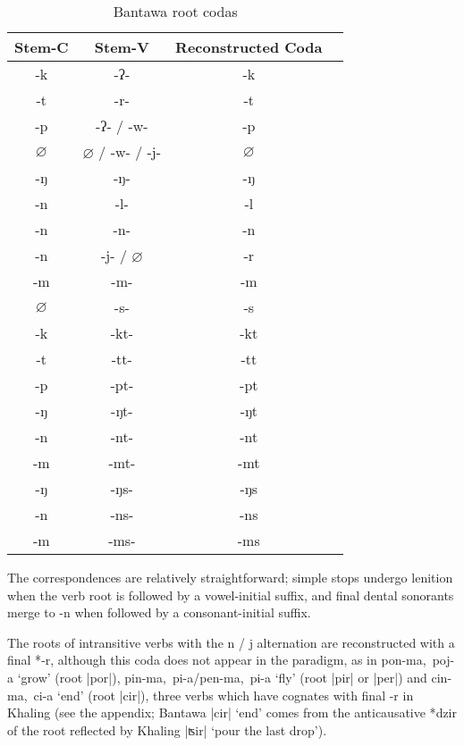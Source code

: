 \documentclass[oneside,a4paper,11pt]{article}
\newcommand{\ipa}[1]{{\phon\mbox{#1}}} %
\newcommand{\dhatu}[2]{|\ipa{#1}| `#2'}
\begin{document}
\begin{table}[h]
\caption{Bantawa root codas} \centering \label{tab:bantawa.root}
\begin{tabular}{cccc}
\toprule
Stem-C & Stem-V & Reconstructed Coda \\
\midrule
\ipa{-k} & \ipa{-ʔ-} & \ipa{-k} \\
\ipa{-t} & \ipa{-r-} & \ipa{-t} \\
\ipa{-p} & \ipa{-ʔ-} /  \ipa{-w-} & \ipa{-p} \\
$\varnothing$ & $\varnothing$ / \ipa{-w-} / \ipa{-j-} & $\varnothing$ \\
\ipa{-ŋ} & \ipa{-ŋ-} & \ipa{-ŋ} \\
\ipa{-n} & \ipa{-l-} & \ipa{-l} \\
\ipa{-n} & \ipa{-n-}  & \ipa{-n} \\
\ipa{-n} & \ipa{-j-} / $\varnothing$ & \ipa{-r} \\
\ipa{-m} & \ipa{-m-} & \ipa{-m} \\
$\varnothing$ & \ipa{-s-} & \ipa{-s} \\
\midrule
\ipa{-k} & \ipa{-kt-} & \ipa{-kt} \\
\ipa{-t} & \ipa{-tt-} & \ipa{-tt} \\
\ipa{-p} & \ipa{-pt-} & \ipa{-pt} \\
\ipa{-ŋ} & \ipa{-ŋt-} & \ipa{-ŋt} \\
\ipa{-n} & \ipa{-nt-} & \ipa{-nt} \\
\ipa{-m} & \ipa{-mt-} & \ipa{-mt} \\
\midrule
\ipa{-ŋ} & \ipa{-ŋs-} & \ipa{-ŋs}  \\
\ipa{-n} & \ipa{-ns-} & \ipa{-ns} \\
\ipa{-m} & \ipa{-ms-} & \ipa{-ms}   \\
\bottomrule
\end{tabular}
\end{table}

The correspondences are relatively straightforward; simple stops undergo lenition when the verb root is followed by a vowel-initial suffix, and final dental sonorants merge to \ipa{-n} when followed by a consonant-initial suffix. 

The roots of intransitive verbs with the \ipa{n} / \ipa{j} alternation are reconstructed with a final *\ipa{-r}, although this coda does not appear in the paradigm, as in \ipa{pon-ma, poj-a} `grow' (root |\ipa{por}|), \ipa{pin-ma, pi-a}/\ipa{pen-ma, pi-a} `fly' (root |\ipa{pir}| or |\ipa{per}|) and \ipa{cin-ma, ci-a} `end' (root |\ipa{cir}|), three verbs which have cognates with final \ipa{-r} in Khaling (see the appendix; Bantawa \dhatu{cir}{end} comes from the anticausative *\ipa{dzir} of the root reflected by Khaling \dhatu{ʦir}{pour the last drop}).
\end{document}
